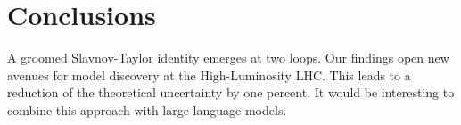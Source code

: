\section{Conclusions}\label{sec:conclusions}

A groomed Slavnov-Taylor identity emerges at two loops. Our findings
open new avenues for model discovery at the High-Luminosity LHC. This
leads to a reduction of the theoretical uncertainty by one percent. It
would be interesting to combine this approach with large language
models.

